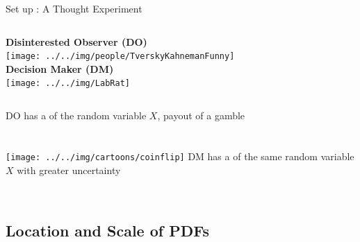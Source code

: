 \begin{frame}{Set up : A Thought Experiment}
\begin{columns}[T]
	\centering
	\textbf{Disinterested Observer (DO)} \\
	\vspace{0.5em}
	\texttt{[image: ../../img/people/TverskyKahnemanFunny]} \\
	\vspace{0.5em}
	\centering
	\textbf{Decision Maker (DM)} \\
	\vspace{0.5em}
	\texttt{[image: ../../img/LabRat]} \\
	\vspace{0.5em}
\end{columns}

\begin{columns}[T]
	\vspace{0.5em}
	DO has a  of the random variable $X$, \eg payout of a gamble \\
	 \\
  \\
\centering
	\texttt{[image: ../../img/cartoons/coinflip]}
	\vspace{0.5em}
  DM has a  of the same random variable $X$ with greater uncertainty\\
    \\
\end{columns}
\end{frame}

\subsection{Location and Scale of PDFs}

